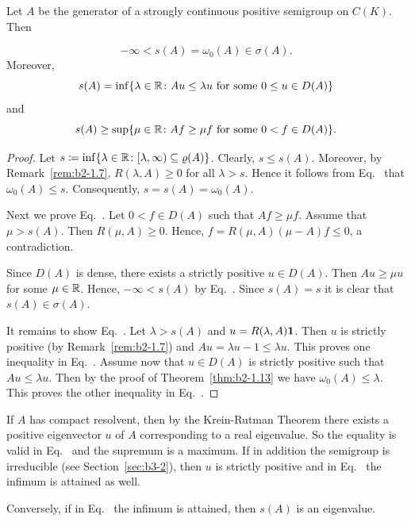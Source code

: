 \begin{corollary}\label{cor:b2-1.14}
Let $A$ be the generator of a strongly continuous positive semigroup on $C(K)$.
Then

\begin{equation}\label{eq:b2-1.7}
-\infty < s(A) = \omega_{0}(A) \in \sigma(A).
\end{equation}
Moreover,
\begin{equation}\label{eq:b2-1.8}
s(A) = \inf\{\lambda \in \R \colon Au \leq \lambda u \text{ for some } 0 \leq  u \in D(A)\}
\end{equation}
and
\begin{equation}\label{eq:b2-1.9}
s(A) \geq \sup\{\mu \in \R \colon Af \geq \mu f \text{ for some } 0 < f \in D(A)\}.
\end{equation}
\end{corollary}
\begin{proof}
Let $s \coloneq \inf\{\lambda \in \R \colon [\lambda,\infty) \subseteq \rho(A)\}$.
Clearly, $s \leq s(A)$.
Moreover, by Remark~\ref{rem:b2-1.7}, $R(\lambda,A) \geq 0$ for all $\lambda > s$.
Hence it follows from Eq.~ that $\omega_{0}(A) \leq s$.
Consequently, $s = s(A) = \omega_{0}(A)$.

Next we prove Eq.~.
Let $0 < f \in D(A)$ such that $Af \geq \mu f$.
Assume that $\mu > s(A)$.
Then $R(\mu,A) \geq 0$.
Hence, $f = R(\mu,A)(\mu-A)f \leq 0$, a contradiction.

Since $D(A)$ is dense, there exists a strictly positive $u \in D(A)$.
Then $Au \geq \mu u$ for some $\mu \in \mathbb{R}$.
Hence, $-\infty < s(A)$ by Eq.~. 
Since $s(A) = s$ it is clear that $s(A) \in \sigma(A)$.

It remains to show Eq.~. 
Let $\lambda > s(A)$ and $u = R(\lambda,A)\mathbf{1}$.
Then $u$ is strictly positive (by  Remark~\ref{rem:b2-1.7}) and $Au = \lambda u - 1 \leq \lambda u$.
This proves one inequality in Eq.~. 
Assume now that $u \in D(A)$ is strictly positive such that $Au \leq \lambda u$.
Then by the proof of Theorem~\ref{thm:b2-1.13} we have $\omega_{0}(A) \leq \lambda$.
This proves the other inequality in Eq.~. 
\end{proof}
\begin{remark}\label{rem:b2-1.15}
If\/ $A$ has compact resolvent, then by the Krein-Rutman Theorem there exists a positive eigenvector $u$ of\/ $A$ corresponding to a real eigenvalue.
So the equality is valid in Eq.~  
and the supremum is a maximum.
If in addition the semigroup is irreducible (see Section~\ref{sec:b3-2}), then $u$ is strictly positive and in Eq.~ 
the infimum is attained as well.

Conversely, if in Eq.~ 
the infimum is attained, then $s(A)$ is an eigenvalue.
\end{remark}
